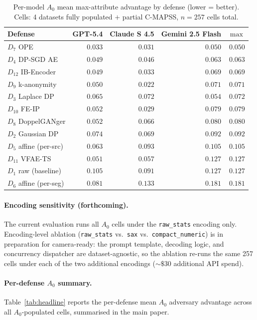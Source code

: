 \documentclass{article}
\theoremstyle{remark}
\begin{document}
\begin{table}[h]
\centering
\caption{Per-model $A_0$ mean max-attribute advantage by defense (lower = better). Cells: 4 datasets fully populated $+$ partial C-MAPSS, $n=257$ cells total.}
\label{tab:a0_per_model}
\small
\begin{tabular}{@{}lrrrr@{}}
\toprule
Defense & GPT-5.4 & Claude S 4.5 & Gemini 2.5 Flash & $\max$ \\
\midrule
$D_7$ OPE & $0.033$ & $0.031$ & $0.050$ & $0.050$ \\
$D_4$ DP-SGD AE & $0.049$ & $0.046$ & $0.063$ & $0.063$ \\
$D_{12}$ IB-Encoder & $0.049$ & $0.033$ & $0.069$ & $0.069$ \\
$D_9$ k-anonymity & $0.050$ & $0.022$ & $0.071$ & $0.071$ \\
$D_3$ Laplace DP & $0.065$ & $0.072$ & $0.054$ & $0.072$ \\
$D_{10}$ FE-IP & $0.052$ & $0.029$ & $0.079$ & $0.079$ \\
$D_8$ DoppelGANger & $0.052$ & $0.066$ & $0.080$ & $0.080$ \\
$D_2$ Gaussian DP & $0.074$ & $0.069$ & $0.092$ & $0.092$ \\
$D_5$ affine (per-src) & $0.063$ & $0.093$ & $0.105$ & $0.105$ \\
$D_{11}$ VFAE-TS & $0.051$ & $0.057$ & $0.127$ & $0.127$ \\
$D_1$ raw (baseline) & $0.105$ & $0.091$ & $0.127$ & $0.127$ \\
$D_6$ affine (per-seg) & $0.081$ & $0.133$ & $0.181$ & $0.181$ \\
\bottomrule
\end{tabular}
\end{table}

\paragraph{Encoding sensitivity (forthcoming).} The current evaluation runs all $A_0$ cells under the \texttt{raw\_stats} encoding only. Encoding-level ablation (\texttt{raw\_stats} vs.\ \texttt{sax} vs.\ \texttt{compact\_numeric}) is in preparation for camera-ready: the prompt template, decoding logic, and concurrency dispatcher are dataset-agnostic, so the ablation re-runs the same 257 cells under each of the two additional encodings ($\sim$$\$30$ additional API spend).

\paragraph{Per-defense $A_0$ summary.} Table~\ref{tab:headline} reports the per-defense mean $A_0$ adversary advantage across all $A_0$-populated cells, summarised in the main paper.
\end{document}
